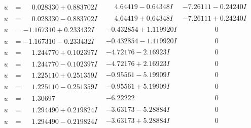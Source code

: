 \documentclass[1p]{elsarticle_modified}
\theoremstyle{definition}
\begin{document}
$$\begin{array}{c|c|c}
\begin{aligned}
u &= \phantom{-}0.028330 + 0.883702 I\end{aligned}
 & \phantom{-}4.64419 - 0.64348 I & -7.26111 - 0.24240 I \\ \hline\begin{aligned}
u &= \phantom{-}0.028330 - 0.883702 I\end{aligned}
 & \phantom{-}4.64419 + 0.64348 I & -7.26111 + 0.24240 I \\ \hline\begin{aligned}
u &= -1.167310 + 0.233432 I\end{aligned}
 & -0.432854 + 1.119920 I & \phantom{-0.000000 } 0 \\ \hline\begin{aligned}
u &= -1.167310 - 0.233432 I\end{aligned}
 & -0.432854 - 1.119920 I & \phantom{-0.000000 } 0 \\ \hline\begin{aligned}
u &= \phantom{-}1.244770 + 0.102397 I\end{aligned}
 & -4.72176 - 2.16923 I & \phantom{-0.000000 } 0 \\ \hline\begin{aligned}
u &= \phantom{-}1.244770 - 0.102397 I\end{aligned}
 & -4.72176 + 2.16923 I & \phantom{-0.000000 } 0 \\ \hline\begin{aligned}
u &= \phantom{-}1.225110 + 0.251359 I\end{aligned}
 & -0.95561 - 5.19909 I & \phantom{-0.000000 } 0 \\ \hline\begin{aligned}
u &= \phantom{-}1.225110 - 0.251359 I\end{aligned}
 & -0.95561 + 5.19909 I & \phantom{-0.000000 } 0 \\ \hline\begin{aligned}
u &= \phantom{-}1.30697\phantom{ +0.000000I}\end{aligned}
 & -6.22222\phantom{ +0.000000I} & \phantom{-0.000000 } 0 \\ \hline\begin{aligned}
u &= \phantom{-}1.294490 + 0.219824 I\end{aligned}
 & -3.63173 - 5.28884 I & \phantom{-0.000000 } 0 \\ \hline\begin{aligned}
u &= \phantom{-}1.294490 - 0.219824 I\end{aligned}
 & -3.63173 + 5.28884 I & \phantom{-0.000000 } 0 \\ \hline\begin{aligned}

\end{aligned}
\end{array}$$
\end{document}
